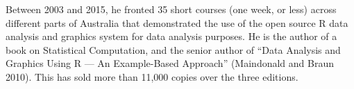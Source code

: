 \documentclass[
  10pt,
  b5paper]{book}
\begin{document}
Between 2003 and 2015, he fronted 35 short courses (one week, or less)
across different parts of Australia that demonstrated the use of the open source R data analysis and graphics system for data analysis purposes.
He is the author of a book on Statistical Computation, and the senior author of ``Data Analysis and Graphics Using R --- An Example-Based Approach'' (Maindonald and Braun 2010). This has sold more than 11,000 copies over
the three editions.
\end{document}
